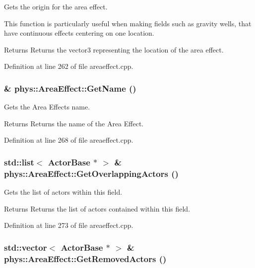 Gets the origin for the area effect. 

This function is particularly useful when making fields such as gravity wells, that have continuous effects centering on one location. \begin{DoxyReturn}{Returns}
Returns the vector3 representing the location of the area effect. 
\end{DoxyReturn}


Definition at line 262 of file areaeffect.cpp.

\hypertarget{classphys_1_1AreaEffect_a6395eeec0a3aec2385027cca35cf15cb}{
\subsubsection[{GetName}]{ \& phys::AreaEffect::GetName ()}}
\label{d4/d55/classphys_1_1AreaEffect_a6395eeec0a3aec2385027cca35cf15cb}


Gets the Area Effects name. 

\begin{DoxyReturn}{Returns}
Returns the name of the Area Effect. 
\end{DoxyReturn}


Definition at line 268 of file areaeffect.cpp.

\hypertarget{classphys_1_1AreaEffect_ab995fec11d9e5fbae1851109067958db}{
\subsubsection[{GetOverlappingActors}]{\setlength{\rightskip}{0pt plus 5cm}std::list$<$ {\bf ActorBase} $\ast$ $>$ \& phys::AreaEffect::GetOverlappingActors ()}}
\label{d4/d55/classphys_1_1AreaEffect_ab995fec11d9e5fbae1851109067958db}


Gets the list of actors within this field. 

\begin{DoxyReturn}{Returns}
Returns the list of actors contained within this field. 
\end{DoxyReturn}


Definition at line 273 of file areaeffect.cpp.

\hypertarget{classphys_1_1AreaEffect_a021763db69e977a3a19ad7cc39df073b}{
\subsubsection[{GetRemovedActors}]{\setlength{\rightskip}{0pt plus 5cm}std::vector$<$ {\bf ActorBase} $\ast$ $>$ \& phys::AreaEffect::GetRemovedActors ()}}
\label{d4/d55/classphys_1_1AreaEffect_a021763db69e977a3a19ad7cc39df073b}


